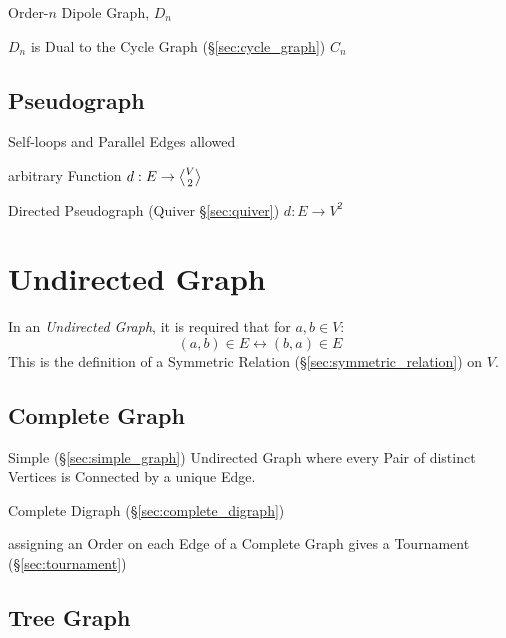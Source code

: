 Order-$n$ Dipole Graph, $D_n$

$D_n$ is Dual to the Cycle Graph (\S\ref{sec:cycle_graph}) $C_n$



\subsection{Pseudograph}\label{sec:pseudograph}

Self-loops and Parallel Edges allowed

arbitrary Function $d : E \rightarrow \angleover{V}{2}$

Directed Pseudograph (Quiver \S\ref{sec:quiver}) $d : E \rightarrow
V^2$



\section{Undirected Graph}\label{sec:undirected_graph}

In an \emph{Undirected Graph}, it is required that for $a,b \in V$:
\[
    (a,b) \in E \leftrightarrow (b,a) \in E
\]
This is the definition of a Symmetric Relation
(\S\ref{sec:symmetric_relation}) on $V$.



\subsection{Complete Graph}\label{sec:complete_graph}

Simple (\S\ref{sec:simple_graph}) Undirected Graph where every Pair of
distinct Vertices is Connected by a unique Edge.

Complete Digraph (\S\ref{sec:complete_digraph})

assigning an Order on each Edge of a Complete Graph gives a Tournament
(\S\ref{sec:tournament})



\subsection{Tree Graph}\label{sec:tree_graph}

